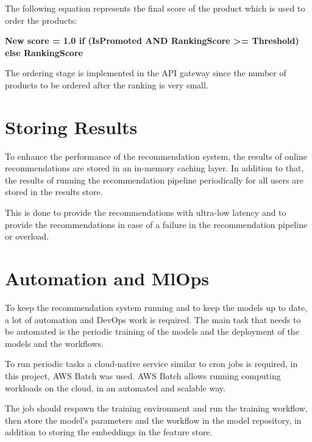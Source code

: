 The following equation represents the final score of the product which is used to order the products:

\textbf{New score = { 1.0  if (IsPromoted AND RankingScore >= Threshold) else RankingScore }}

The ordering stage is implemented in the API gateway since the number of products to be ordered after the ranking is very small.


\section{Storing Results}

To enhance the performance of the recommendation system, the results of online recommendations are stored in an in-memory caching layer.
In addition to that, the results of running the recommendation pipeline periodically for all users are stored in the results store.

This is done to provide the recommendations with ultra-low latency and to provide the recommendations in case of a failure in the recommendation pipeline or overload.

\section{Automation and MlOps}

To keep the recommendation system running and to keep the models up to date, a lot of automation and DevOps work is required.
The main task that needs to be automated is the periodic training of the models and the deployment of the models and the workflows.

To run periodic tasks a cloud-native service similar to cron jobs is required, in this project, AWS Batch \cite{AwsBatch} was used.
AWS Batch allows running computing workloads on the cloud, in an automated and scalable way.

The job should respawn the training environment and run the training workflow, then store the model's parameters and the workflow in the model repository, in addition to storing the embeddings in the feature store.

